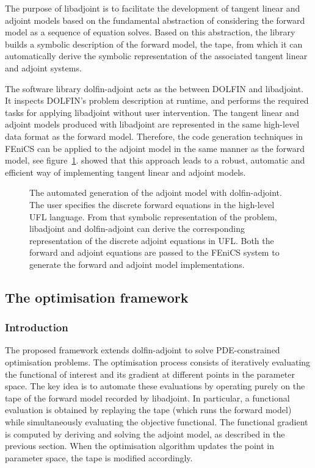 \documentclass[prodmode,acmtoms]{acmsmall}
\newcommand{\fenics}{{\mbox{FEniCS}}\xspace}
\newcommand{\dolfin}{{\mbox{DOLFIN}}\xspace}
\newcommand{\da}{\mbox{{dolfin-adjoint}}\xspace}
\newcommand{\libadjoint}{\mbox{{libadjoint}}\xspace}
\begin{document}
The purpose of \libadjoint is to facilitate the development of tangent linear and adjoint models based on the fundamental abstraction of considering the forward model as a sequence of equation solves. 
Based on this abstraction, the library builds a symbolic description of the forward model, the tape, from which it can automatically derive the symbolic representation of the associated tangent linear and adjoint systems. 

The software library \da acts as the between \dolfin and \libadjoint. 
It inspects \dolfin's problem description at runtime, and performs the required tasks for applying \libadjoint without user intervention. 
The tangent linear and adjoint models produced with \libadjoint are represented in the same high-level data format as the forward model. 
Therefore, the code generation techniques in \fenics can be applied to the adjoint model in the same manner as the forward model, see figure~\ref{fig:our_approach}. 
 showed that this approach leads to a robust, automatic and efficient way of implementing tangent linear and adjoint models.  

\begin{figure}

  \caption{The automated generation of the adjoint model with \da.
    The user specifies the discrete forward equations in the high-level UFL language.
    From that symbolic representation of the problem, \libadjoint and \da can derive the corresponding representation of the discrete adjoint
    equations in UFL. 
    Both the forward and adjoint equations are passed to the \fenics system to generate the forward and adjoint model implementations.}
  \label{fig:our_approach} 
\end{figure}

\subsection{The optimisation framework}\label{sec:opt_user_interface}
\subsubsection{Introduction}

The proposed framework extends \da to solve PDE-constrained optimisation problems. 
The optimisation process consists of iteratively evaluating the functional of interest and its gradient at different points in the parameter space. 
The key idea is to automate these evaluations by operating purely on the tape of the forward model recorded by \libadjoint. 
In particular, a functional evaluation is obtained by replaying the tape (which runs the forward model) while simultaneously evaluating the objective functional. 
The functional gradient is computed by deriving and solving the adjoint model, as described in the previous section. 
When the optimisation algorithm updates the point in parameter space, the tape is modified accordingly. 
\end{document}
